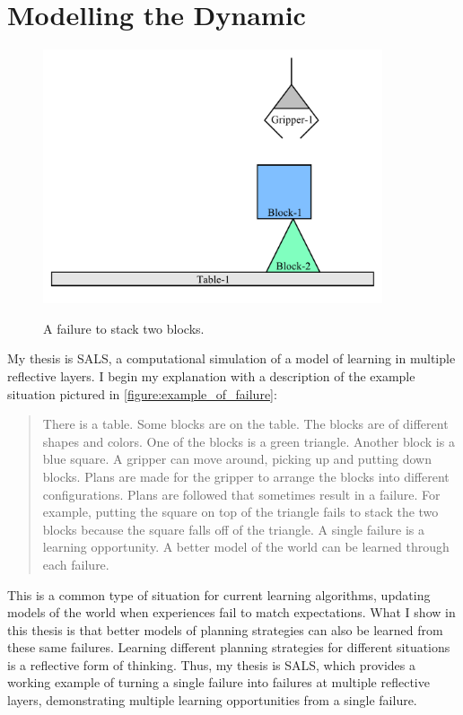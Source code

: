 \chapter{Modelling the Dynamic}
\label{chapter:modelling_the_dynamic}

\begin{figure}[bth]
\includegraphics[width=10cm]{gfx/blocks_world_example_failure} \\ \medskip
\caption{A failure to stack two blocks.}
\label{figure:example_of_failure}
\end{figure}

My thesis is SALS, a computational simulation of a model of learning
in multiple reflective layers.  I begin my explanation with a
description of the example situation pictured in
\autoref{figure:example_of_failure}:
\begin{quote}
There is a table.  Some blocks are on the table.  The blocks are of
different shapes and colors.  One of the blocks is a green triangle.
Another block is a blue square.  A gripper can move around, picking up
and putting down blocks.  Plans are made for the gripper to arrange
the blocks into different configurations.  Plans are followed that
sometimes result in a failure.  For example, putting the square on top
of the triangle fails to stack the two blocks because the square falls
off of the triangle.  A single failure is a learning opportunity.  A
better model of the world can be learned through each failure.
\end{quote}
This is a common type of situation for current learning algorithms,
updating models of the world when experiences fail to match
expectations.  What I show in this thesis is that better models of
planning strategies can also be learned from these same failures.
Learning different planning strategies for different situations is a
reflective form of thinking.  Thus, my thesis is SALS, which provides
a working example of turning a single failure into failures at
multiple reflective layers, demonstrating multiple learning
opportunities from a single failure.

